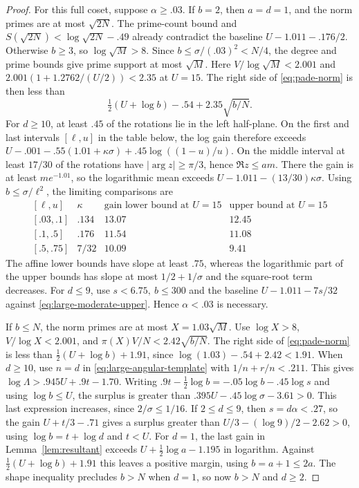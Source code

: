 \begin{proof}
For this full coset, suppose \(\alpha\ge.03\).
If \(b=2\), then \(a=d=1\), and the norm primes are at
most \(\sqrt{2N}\). The prime-count bound and
\(S(\sqrt{2N})<\log\sqrt{2N}-.49\) already contradict
the baseline \(U-1.011-.176/2\).
Otherwise \(b\ge3\), so \(\log\sqrt M>8\). Since
\(b\le\sigma/(.03)^2<N/4\), the degree and prime bounds
give prime support at most \(\sqrt M\). Here \(V/\log\sqrt M<2.001\) and
\(2.001(1+1.2762/(U/2))<2.35\) at \(U=15\).
The right side of \eqref{eq:pade-norm} is then less than
\begin{equation}\label{eq:large-moderate-upper}
 \tfrac12(U+\log b)-.54+2.35\sqrt{b/N}.
\end{equation}
For \(d\ge10\), at least \(.45\) of the rotations lie in the
left half-plane. On the first and last intervals
\([\ell,u]\) in the table below, the log gain therefore exceeds
\(U-.001-.55(1.01+\kappa\sigma)+.45\log((1-u)/u)\).
On the middle interval at least \(17/30\) of the rotations
have \(|\arg z|\ge\pi/3\), hence \(\Re z\le am\). There the
gain is at least \(me^{-1.01}\), so the logarithmic mean
exceeds \(U-1.011-(13/30)\kappa\sigma\).
Using \(b\le\sigma/\ell^2\), the limiting comparisons are
\[
\begin{array}{c|c|cc}
{}[\ell,u]&\kappa&\text{gain lower bound at }U=15
                    &\text{upper bound at }U=15\\ \hline
{}[.03,.1]&.134&13.07&12.45\\
{}[.1,.5]&.176&11.54&11.08\\
{}[.5,.75]&7/32&10.09&9.41
\end{array}
\]
The affine lower bounds have slope at least \(.75\), whereas
the logarithmic part of the upper bounds has slope at most
\(1/2+1/\sigma\) and the square-root term decreases.
For \(d\le9\),
use \(s<6.75,\ b\le300\) and the baseline
\(U-1.011-7s/32\) against \eqref{eq:large-moderate-upper}.
Hence \(\alpha<.03\) is necessary.

If \(b\le N\), the norm primes are at most \(X=1.03\sqrt M\).
Use \(\log X>8\), \(V/\log X<2.001\), and
\(\pi(X)V/N<2.42\sqrt{b/N}\).
The right side of \eqref{eq:pade-norm} is less than
\(\tfrac12(U+\log b)+1.91\), since
\(\log(1.03)-.54+2.42<1.91\).
When \(d\ge10\), use \(n=d\) in
\eqref{eq:large-angular-template} with \(1/n+r/n<.211\).
This gives \(\log\Lambda>.945U+.9t-1.70\). Writing
\(.9t-\tfrac12\log b=-.05\log b-.45\log s\) and using
\(\log b\le U\), the surplus is greater than
\(.395U-.45\log\sigma-3.61>0\).
This last expression increases, since \(2/\sigma\le1/16\).
If \(2\le d\le9\), then \(s=d\alpha<.27\), so the gain
\(U+t/3-.71\) gives a surplus
greater than \(U/3-(\log9)/2-2.62>0\), using
\(\log b=t+\log d\) and \(t<U\).
For \(d=1\), the last gain in Lemma~\ref{lem:resultant}
exceeds \(U+\tfrac12\log a-1.195\) in logarithm.
Against \(\tfrac12(U+\log b)+1.91\) this leaves a positive
margin, using \(b=a+1\le2a\). The shape inequality precludes
\(b>N\) when \(d=1\), so now \(b>N\) and \(d\ge2\).


\end{proof}
